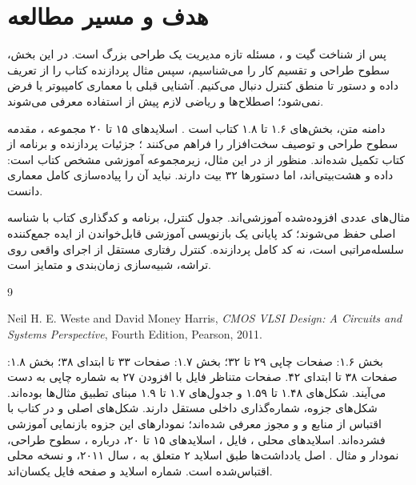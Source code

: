 \documentclass[12pt,a4paper]{article}
\newcommand{\secnum}[1]{\mbox{\beginL#1\endL}}
\begin{document}
\MakeAssignmentCover
\section*{هدف و مسیر مطالعه}
پس از شناخت گیت و ، مسئله تازه مدیریت یک طراحی بزرگ است.
در این بخش، سطوح طراحی و تقسیم کار را می‌شناسیم، سپس مثال پردازنده کتاب را
از تعریف داده و دستور تا منطق کنترل دنبال می‌کنیم.
آشنایی قبلی با معماری کامپیوتر یا  فرض نمی‌شود؛
اصطلاح‌ها و ریاضی لازم پیش از استفاده معرفی می‌شوند.

دامنه متن، بخش‌های \secnum{۱.۶} تا \secnum{۱.۸} کتاب است
\cite{weste}. اسلایدهای ۱۵ تا ۲۰ مجموعه ، مقدمه سطوح طراحی و
توصیف سخت‌افزار را فراهم می‌کنند \cite{intro}؛ جزئیات پردازنده و برنامه از کتاب تکمیل شده‌اند.
منظور از  در این مثال، زیرمجموعه آموزشی مشخص کتاب است:
داده و  هشت‌بیتی‌اند، اما دستورها ۳۲ بیت دارند.
نباید آن را پیاده‌سازی کامل معماری  دانست.

مثال‌های عددی افزوده‌شده آموزشی‌اند. جدول کنترل، برنامه و کدگذاری کتاب با
شناسه اصلی حفظ می‌شوند؛ کد  پایانی یک بازنویسی آموزشی قابل‌خواندن
از ایده جمع‌کننده سلسله‌مراتبی است، نه کد کامل پردازنده.
کنترل رفتاری مستقل از اجرای واقعی روی تراشه، شبیه‌سازی زمان‌بندی و  متمایز است.
\tableofcontents
\clearpage




\begin{thebibliography}{9}
\begin{latin}
Neil H. E. Weste and David Money Harris,
\textit{CMOS VLSI Design: A Circuits and Systems Perspective},
Fourth Edition, Pearson, 2011.
\end{latin}
بخش \secnum{۱.۶}: صفحات چاپی ۲۹ تا ۳۲؛ بخش \secnum{۱.۷}: صفحات ۳۳ تا ابتدای ۳۸؛
بخش \secnum{۱.۸}: صفحات ۳۸ تا ابتدای ۴۲.
صفحات متناظر فایل  با افزودن ۲۷ به شماره چاپی به دست می‌آیند.
شکل‌های \secnum{۱.۴۸} تا \secnum{۱.۵۹} و جدول‌های \secnum{۱.۷} تا \secnum{۱.۹}
مبنای تطبیق مثال‌ها بوده‌اند. شکل‌های جزوه، شماره‌گذاری داخلی مستقل دارند.
شکل‌های اصلی  و  در کتاب با اقتباس از منابع 
و  و مجوز  معرفی شده‌اند؛ نمودارهای این جزوه بازنمایی آموزشی فشرده‌اند.
اسلایدهای محلی ، فایل ،
اسلایدهای ۱۵ تا ۲۰، درباره ، سطوح طراحی،
نمودار  و مثال .
اصل یادداشت‌ها طبق اسلاید ۲ متعلق به ، سال ۲۰۱۱،
و نسخه محلی اقتباس‌شده است. شماره اسلاید و صفحه فایل یکسان‌اند.
\end{thebibliography}
\end{document}
